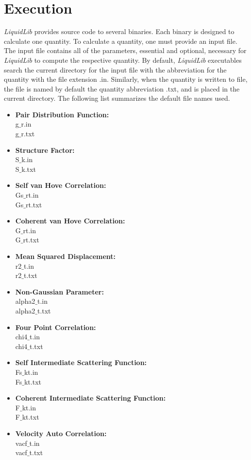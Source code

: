 \documentclass{article}
\begin{document}
\section{Execution}
\textit{LiquidLib} provides source code to several binaries.  Each binary is designed to calculate one quantity.  To calculate a quantity, one must provide an input file.  The input file contains all of the parameters, essential and optional, necessary for \textit{LiquidLib} to compute the respective quantity.  By default, \textit{LiquidLib} executables search the current directory for the input file with the abbreviation for the quantity with the file extension .in.  Similarly, when the quantity is written to file, the file is named by default the quantity abbreviation .txt, and is placed in the current directory.  The following list summarizes the default file names used.
\begin{multicols}{2} \label{input_output}
\begin{itemize}
\item \textbf{Pair Distribution Function:}
 \\g$\_$r.in
 \\g$\_$r.txt
\item \textbf{Structure Factor:}
 \\S$\_$k.in
 \\S$\_$k.txt
 \item \textbf{Self van Hove Correlation:}
 \\Gs$\_$rt.in
 \\Gs$\_$rt.txt
 \item \textbf{Coherent van Hove Correlation:}
 \\G$\_$rt.in
 \\G$\_$rt.txt
\item \textbf{Mean Squared Displacement:}
 \\r2$\_$t.in
 \\r2$\_$t.txt
\item \textbf{Non-Gaussian Parameter:}
 \\alpha2$\_$t.in
 \\alpha2$\_$t.txt
 \item \textbf{Four Point Correlation:}
 \\chi4$\_$t.in
 \\chi4$\_$t.txt
\item \textbf{Self Intermediate Scattering Function:}
 \\Fs$\_$kt.in
 \\Fs$\_$kt.txt
\item \textbf{Coherent Intermediate Scattering Function:}
\\F$\_$kt.in
\\F$\_$kt.txt
 \item \textbf{Velocity Auto Correlation:}
 \\vacf$\_$t.in
 \\vacf$\_$t.txt
\end{itemize}
\end{multicols}
\end{document}
